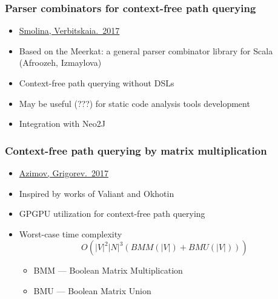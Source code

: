 \documentclass[xcolor=table]{beamer}
\begin{document}
\begin{frame}
  \transwipe[direction=90]
  \frametitle{Parser combinators for context-free path querying}
  \begin{itemize}
    \item \href{http://plc.sfedu.ru/files/PLC-2017-proceedings.pdf\#page=233}{Smolina, Verbitskaia.~2017}
    \item Based on the Meerkat: a general parser combinator library for Scala (Afroozeh, Izmaylova)
    \item Context-free path querying without DSLs
    \item May be useful (???) for static code analysis tools development
    \item Integration with Neo2J
  \end{itemize}
\end{frame}

\begin{frame}
  \transwipe[direction=90]
  \frametitle{Context-free path querying by matrix multiplication}
  \begin{itemize}
    \item \href{https://arxiv.org/abs/1707.01007}{Azimov, Grigorev.~2017}
    \item Inspired by works of Valiant and Okhotin    
    \item GPGPU utilization for context-free path querying
    \item Worst-case time complexity $$O(|V|^2 |N|^3 (BMM(|V|) + BMU(|V|)))$$
    \begin{itemize}
      \item BMM --- Boolean Matrix Multiplication
      \item BMU --- Boolean Matrix Union
    \end{itemize}

  \end{itemize}
\end{frame}
\end{document}
